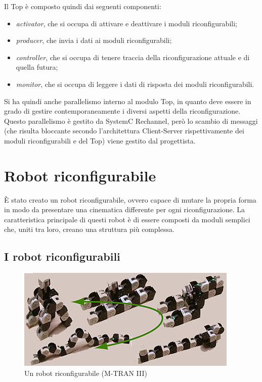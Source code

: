 \documentclass[a4paper,titlepage]{book}
\begin{document}
Il Top è composto quindi dai seguenti componenti:

\begin{itemize}
  \item \textit{activator}, che si occupa di attivare e deattivare i moduli riconfigurabili;
  \item \textit{producer}, che invia i dati ai moduli riconfigurabili;
  \item \textit{controller}, che si occupa di tenere traccia della riconfigurazione attuale e di quella futura;
  \item \textit{monitor}, che si occupa di leggere i dati di risposta dei moduli riconfigurabili.
\end{itemize}

Si ha quindi anche parallelismo interno al modulo Top, in quanto deve essere in grado di gestire contemporaneamente i diversi aspetti della riconfigurazione. Questo parallelismo è gestito da SystemC Rechannel, però lo scambio di messaggi (che risulta bloccante secondo l'architettura Client-Server rispettivamente dei moduli riconfigurabili e del Top) viene gestito dal progettista.

\section{Robot riconfigurabile}

È stato creato un robot riconfigurabile, ovvero capace di mutare la propria forma in modo da presentare una cinematica differente per ogni riconfigurazione. La caratteristica principale di questi robot è di essere composti da moduli semplici che, uniti tra loro, creano una struttura più complessa.


\subsection{I robot riconfigurabili}

\begin{figure}[htbp]
\centering
\includegraphics[scale=0.5]{robot_riconfigurabile1.jpg}
\caption{Un robot riconfigurabile (M-TRAN III)}\label{fig:9}
\end{figure}
\end{document}
